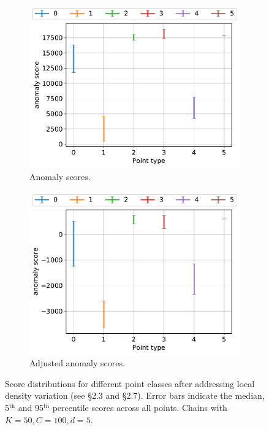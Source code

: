\documentclass[11pt,onecolumn]{article}
\begin{document}
\begin{figure}[ht!]
		\hfill
    \begin{subfigure}[t]{0.3\textwidth}
        \centering
        \includegraphics[width=\linewidth]{fig/chains_type_anomscores_k50c50d5.pdf}
        \caption{Anomaly scores.}
    \end{subfigure}
		\hfill
    \begin{subfigure}[t]{0.3\textwidth}
        \centering
        \includegraphics[width=\linewidth]{fig/chains_type_anomscores-adj_k50c50d5.pdf}
        \caption{Adjusted anomaly scores.}
    \end{subfigure}
    \caption{Score distributions for different point classes after addressing local density variation (see \S2.3 and \S2.7). Error bars indicate the median, 5$^{\textrm{th}}$ and 95$^{\textrm{th}}$ percentile scores across all points. Chains with $K=50, C=100, d=5$.}
\end{figure}
\end{document}
